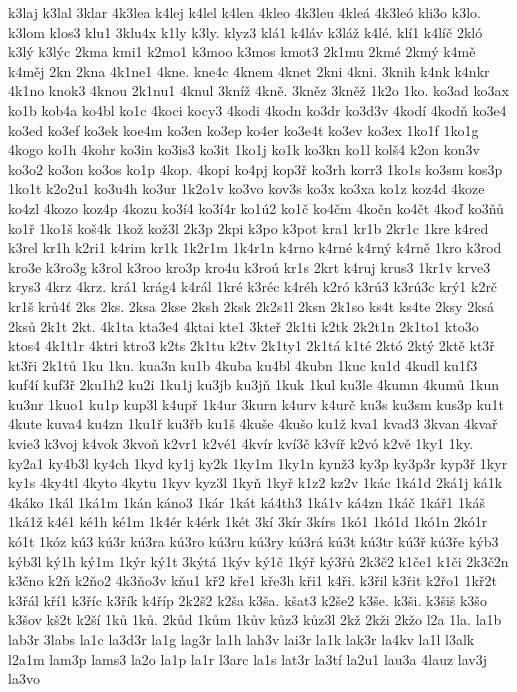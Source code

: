{k3laj
k3lal
3klar
4k3lea
k4lej
k4lel
k4len
4kleo
4k3leu
4kleá
4k3leó
kli3o
k3lo.
k3lom
klos3
klu1
3klu4x
k1ly
k3ly.
klyz3
klá1
k4láv
k3láž
k4lé.
klí1
k4líč
2kló
k3lý
k3lýc
2kma
kmi1
k2mo1
k3moo
k3mos
kmot3
2k1mu
2kmé
2kmý
k4mě
k4měj
2kn
2kna
4k1ne1
4kne.
kne4c
4knem
4knet
2kni
4kni.
3knih
k4nk
k4nkr
4k1no
knok3
4knou
2k1nu1
4knul
3kníž
4kně.
3kněz
3kněž
1k2o
1ko.
ko3ad
ko3ax
ko1b
kob4a
ko4bl
ko1c
4koci
kocy3
4kodi
4kodn
ko3dr
ko3d3v
4kodí
4kodň
ko3e4
ko3ed
ko3ef
ko3ek
koe4m
ko3en
ko3ep
ko4er
ko3e4t
ko3ev
ko3ex
1ko1f
1ko1g
4kogo
ko1h
4kohr
ko3in
ko3is3
ko3it
1ko1j
ko1k
ko3kn
ko1l
kolš4
k2on
kon3v
ko3o2
ko3on
ko3os
ko1p
4kop.
4kopi
ko4pj
kop3ř
ko3rh
korr3
1ko1s
ko3sm
kos3p
1ko1t
k2o2u1
ko3u4h
ko3ur
1k2o1v
ko3vo
kov3s
ko3x
ko3xa
ko1z
koz4d
4koze
ko4zl
4kozo
koz4p
4kozu
ko3í4
ko3í4r
ko1ú2
ko1č
ko4čm
4kočn
ko4čt
4koď
ko3ňů
ko1ř
1ko1š
koš4k
1kož
kož3l
2k3p
2kpi
k3po
k3pot
kra1
kr1b
2kr1c
1kre
k4red
k3rel
kr1h
k2ri1
k4rim
kr1k
1k2r1m
1k4r1n
k4rno
k4rné
k4rný
k4rně
1kro
k3rod
kro3e
k3ro3g
k3rol
k3roo
kro3p
kro4u
k3roú
kr1s
2krt
k4ruj
krus3
1kr1v
krve3
krys3
4krz
4krz.
krá1
krág4
k4rál
1kré
k3réc
k4réh
k2ró
k3rú3
k3rú3c
krý1
k2rč
kr1š
krů4ť
2ks
2ks.
2ksa
2kse
2ksh
2ksk
2k2s1l
2ksn
2k1so
ks4t
ks4te
2ksy
2ksá
2ksů
2k1t
2kt.
4k1ta
kta3e4
4ktai
kte1
3kteř
2k1ti
k2tk
2k2t1n
2k1to1
kto3o
ktos4
4k1t1r
4ktri
ktro3
k2ts
2k1tu
k2tv
2k1ty1
2k1tá
k1té
2któ
2ktý
2ktě
kt3ř
kt3ři
2k1tů
1ku
1ku.
kua3n
ku1b
4kuba
ku4bl
4kubn
1kuc
ku1d
4kudl
ku1f3
kuf4í
kuf3ř
2ku1h2
ku2i
1ku1j
ku3jb
ku3jň
1kuk
1kul
ku3le
4kumn
4kumů
1kun
ku3nr
1kuo1
ku1p
kup3l
k4upř
1k4ur
3kurn
k4urv
k4urč
ku3s
ku3sm
kus3p
ku1t
4kute
kuva4
ku4zn
1ku1ř
ku3řb
ku1š
4kuše
4kušo
ku1ž
kva1
kvad3
3kvan
4kvař
kvie3
k3voj
k4vok
3kvoň
k2vr1
k2vé1
4kvír
kví3č
k3víř
k2vó
k2vě
1ky1
1ky.
ky2a1
ky4b3l
ky4ch
1kyd
ky1j
ky2k
1ky1m
1ky1n
kynž3
ky3p
ky3p3r
kyp3ř
1kyr
ky1s
4ky4tl
4kyto
4kytu
1kyv
kyz3l
1kyň
1kyř
k1z2
kz2v
1kác
1ká1d
2ká1j
ká1k
4káko
1kál
1ká1m
1kán
káno3
1kár
1kát
ká4th3
1ká1v
ká4zn
1káč
1kář1
1káš
1ká1ž
k4é1
ké1h
ké1m
1k4ér
k4érk
1két
3kí
3kír
3kírs
1kó1
1kó1d
1kó1n
2kó1r
kó1t
1kóz
kú3
kú3r
kú3ra
kú3ro
kú3ru
kú3ry
kú3rá
kú3t
kú3tr
kú3ř
kú3ře
kýb3
kýb3l
ký1h
ký1m
1kýr
ký1t
3kýtá
1kýv
ký1č
1kýř
ký3řů
2k3č2
k1če1
k1či
2k3č2n
k3čno
k2ň
k2ňo2
4k3ňo3v
kňu1
kř2
kře1
kře3h
kři1
k4ři.
k3řil
k3řit
k2řo1
1kř2t
k3řál
kří1
k3říc
k3řík
k4říp
2k2š2
k2ša
k3ša.
kšat3
k2še2
k3še.
k3ši.
k3šiš
k3šo
k3šov
kš2t
k2ší
1ků
1ků.
2kůd
1kům
1kův
kůz3
kůz3l
2kž
2kži
2kžo
l2a
1la.
la1b
lab3r
3labs
la1c
la3d3r
la1g
lag3r
la1h
lah3v
lai3r
la1k
lak3r
la4kv
la1l
l3alk
l2a1m
lam3p
lams3
la2o
la1p
la1r
l3arc
la1s
lat3r
la3tí
la2u1
lau3a
4lauz
lav3j
la3vo
}
